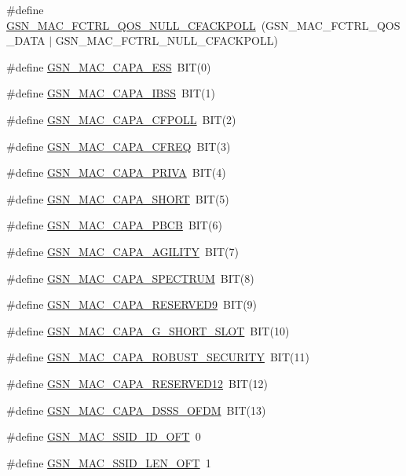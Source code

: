 \begin{DoxyCompactItemize}
\item 
\#define \hyperlink{a00523_a3b2fad615ee21be5a8eafd142025dbef}{GSN\_\-MAC\_\-FCTRL\_\-QOS\_\-NULL\_\-CFACKPOLL}~(GSN\_\-MAC\_\-FCTRL\_\-QOS\_\-DATA  $|$ GSN\_\-MAC\_\-FCTRL\_\-NULL\_\-CFACKPOLL)
\item 
\#define \hyperlink{a00523_ad3fcd60f256b619cfdbc021fe7557868}{GSN\_\-MAC\_\-CAPA\_\-ESS}~BIT(0)
\item 
\#define \hyperlink{a00523_aa85a5c8ba2e35c2cf81272cda811b187}{GSN\_\-MAC\_\-CAPA\_\-IBSS}~BIT(1)
\item 
\#define \hyperlink{a00523_a739b2c5021ef3f7666dbdef3d5329298}{GSN\_\-MAC\_\-CAPA\_\-CFPOLL}~BIT(2)
\item 
\#define \hyperlink{a00523_a4718f541af499d4bc8615181a3b47669}{GSN\_\-MAC\_\-CAPA\_\-CFREQ}~BIT(3)
\item 
\#define \hyperlink{a00523_aa6e5e7ce295d1680d0732f20a547ab88}{GSN\_\-MAC\_\-CAPA\_\-PRIVA}~BIT(4)
\item 
\#define \hyperlink{a00523_a45a7deacef1941420c818f1778ac5254}{GSN\_\-MAC\_\-CAPA\_\-SHORT}~BIT(5)
\item 
\#define \hyperlink{a00523_a0b79bd937db4ae3b76643316109fd73b}{GSN\_\-MAC\_\-CAPA\_\-PBCB}~BIT(6)
\item 
\#define \hyperlink{a00523_ac104dc806c321c567742b1acf84e4154}{GSN\_\-MAC\_\-CAPA\_\-AGILITY}~BIT(7)
\item 
\#define \hyperlink{a00523_a12e72b680f4bf7e12e43888e905a5c78}{GSN\_\-MAC\_\-CAPA\_\-SPECTRUM}~BIT(8)
\item 
\#define \hyperlink{a00523_a54043a0652e294648f141353f64b930f}{GSN\_\-MAC\_\-CAPA\_\-RESERVED9}~BIT(9)
\item 
\#define \hyperlink{a00523_a101962b6cfc1160ab9637260022980fc}{GSN\_\-MAC\_\-CAPA\_\-G\_\-SHORT\_\-SLOT}~BIT(10)
\item 
\#define \hyperlink{a00523_a6c0a845a75e015b33135c1901ec347da}{GSN\_\-MAC\_\-CAPA\_\-ROBUST\_\-SECURITY}~BIT(11)
\item 
\#define \hyperlink{a00523_a0fdb3e122d9b19332daa05bfeddef6e4}{GSN\_\-MAC\_\-CAPA\_\-RESERVED12}~BIT(12)
\item 
\#define \hyperlink{a00523_aeaff7d5464936f85df44f5ffe7e45372}{GSN\_\-MAC\_\-CAPA\_\-DSSS\_\-OFDM}~BIT(13)
\item 
\#define \hyperlink{a00523_ab9d8007d47e42460dec2f7fb1c0a70d2}{GSN\_\-MAC\_\-SSID\_\-ID\_\-OFT}~0
\item 
\#define \hyperlink{a00523_afd46ed8cc0cc1fb3ae986b3ee5e1bd60}{GSN\_\-MAC\_\-SSID\_\-LEN\_\-OFT}~1

\end{DoxyCompactItemize}
